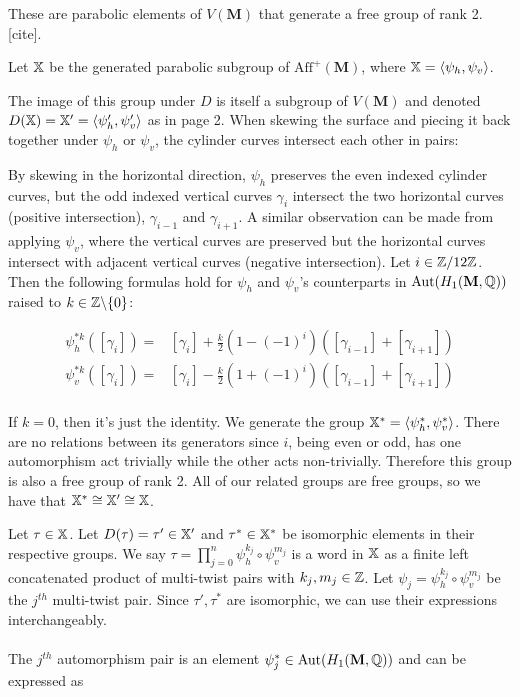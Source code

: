 \documentclass[]{article}
\def\bM{\mathbf{M}}
\def\<{\langle} \def\>{\rangle}
\def\Aut{\mathrm{Aut}}
\begin{document}
These are parabolic elements of $V(\bM)$ that generate a free group of rank 2. [cite].
\begin{Def}
Let $\mathbb{X}$ be the generated parabolic subgroup of $\text{Aff}^+(\bM)$, where $\XX=\<\psi_h,\psi_v \>$.
\end{Def}

The image of this group under $D$ is itself a subgroup of $V(\bM)$ and denoted $D(\XX)=\XX'=\<\psi_h',\psi_v' \>$ as in page 2. When skewing the surface and piecing it back together under $\psi_h$ or $\psi_v$, the cylinder curves intersect each other in pairs:

\begin{figure}[H]
\centering

\end{figure}

By skewing in the horizontal direction, $\psi_h$ preserves the even indexed cylinder curves, but the odd indexed vertical curves $\gamma_i$ intersect the two horizontal curves (positive intersection), $\gamma_{i-1}$ and $\gamma_{i+1}$. A similar observation can be made from applying $\psi_v$, where the vertical curves are preserved but the horizontal curves intersect with adjacent vertical curves (negative intersection). Let $i\in\mathbb{Z}/12\mathbb{Z}$. Then the following formulas hold for $\psi_h$ and $\psi_v$'s counterparts in $\Aut(H_1(\bM,\QQ))$ raised to $k\in\mathbb{Z}\backslash\{0\}$:

\begin{align*}
\psi^{*k}_h([\gamma_i])=&[\gamma_i] + \frac{k}{2}(1-(-1)^i)([\gamma_{i-1}]+[\gamma_{i+1}])\\
\psi^{*k}_v([\gamma_i])=&[\gamma_i] - \frac{k}{2}(1+(-1)^i)([\gamma_{i-1}]+[\gamma_{i+1}])\\
\end{align*}

If $k=0$, then it's just the identity. We generate the group $\XX^*=\<\psi^{*}_h,\psi^{*}_v \>$. There are no relations between its generators since $i$, being even or odd, has one automorphism act trivially while the other acts non-trivially. Therefore this group is also a free group of rank 2. All of our related groups are free groups, so we have that $\mathbb{X}^*\cong\mathbb{X}'\cong\mathbb{X}$. 


Let $\tau\in\mathbb{X}$. Let $D(\tau)=\tau'\in\mathbb{X}'$ and $\tau^*\in\mathbb{X}^*$ be isomorphic elements in their respective groups. We say $\tau=\prod_{j=0}^{n}\psi_h^{k_j}\circ\psi_v^{m_j}$ is a word in $\mathbb{X}$ as a finite left concatenated product of multi-twist pairs with $k_j,m_j\in\mathbb{Z}$. Let $\psi_j=\psi_h^{k_j}\circ\psi_v^{m_j}$ be the $j^{th}$ multi-twist pair. Since $\tau',\tau^*$ are isomorphic, we can use their expressions interchangeably. \\\\
The $j^{th}$ automorphism pair is an element $\psi_j^*\in\Aut(H_1(\bM,\QQ))$ and can be expressed as 
\end{document}
